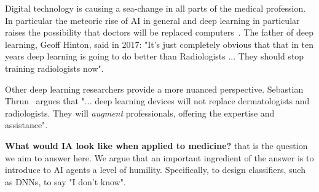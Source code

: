 \documentclass[11pt]{article}
\begin{document}
Digital technology is causing a sea-change in all parts of the medical
profession. In particular the meteoric rise of AI in general and deep
learning in particular raises the possibility that doctors will be
replaced computers~\cite{Mukherjee2017}. The father of deep learning,
Geoff Hinton, said in 2017: "It's just completely obvious that that in
ten years deep learning is going to do better than Radiologists
... They should stop training radiologists now".

Other deep learning researchers provide a more nuanced
perspective. Sebastian
Thrun~\cite{Mukherjee2017,esteva2017dermatologist} argues that
"... deep learning devices will not replace dermatologists and
radiologists. They will {\em augment} professionals, offering the
expertise and assistance".

{\bf What would IA look like when applied to medicine?} that is the
question we aim to answer here.  We argue that an important ingredient
of the answer is to introduce to AI agents a level of
humility. Specifically, to design classifiers, such as DNNs, to say "I
don't know".

\end{document}
